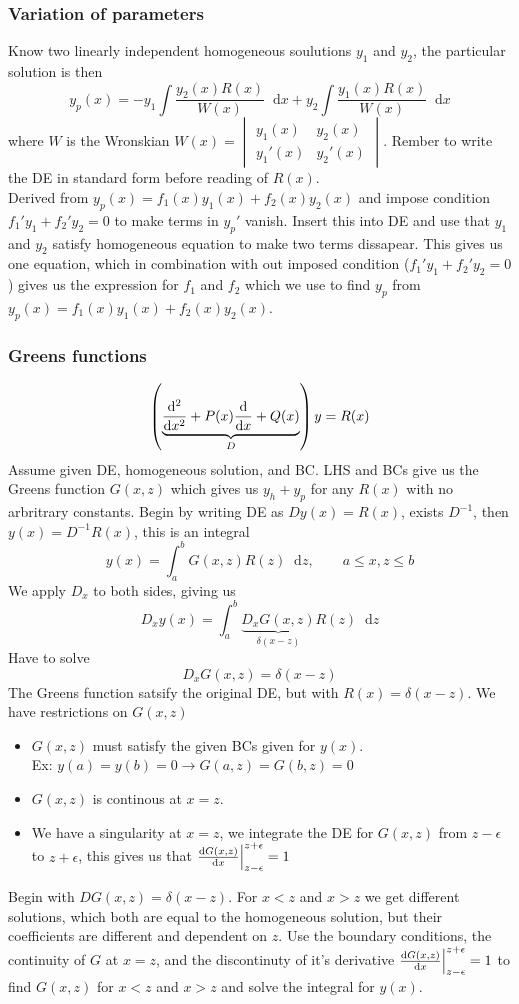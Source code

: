 \documentclass[a4paper, 10pt]{article}
\newcommand*\diff{\mathop{}\!\mathrm{d}}
\begin{document}
\begin{multicols*}{3}
\subsubsection*{\small Variation of parameters}
Know two linearly independent homogeneous soulutions $y_1$ and $y_2$, the particular solution is then
$$ y_p(x) = -y_1 \int \frac{y_2(x)R(x)}{W(x)} \diff x + y_2 \int \frac{y_1(x) R(x)}{W(x)}\diff x$$
where $W$ is the Wronskian $W(x) = \begin{vmatrix} y_1(x)  & y_2(x)\\ y_1'(x) & y_2'(x) \end{vmatrix}.$ Rember to write the DE in standard form before reading of $R(x)$. \\
Derived from $y_p(x) = f_1(x)y_1(x) + f_2(x)y_2(x)$ and impose condition $f_1'y_1 + f_2'y_2 = 0$ to make terms in $y_p'$ vanish. Insert this into DE and use that $y_1$ and $y_2$ satisfy homogeneous equation to make two terms dissapear. This gives us one equation, which in combination with out imposed condition ($f_1'y_1 + f_2'y_2 = 0$) gives us the expression for $f_1$ and $f_2$ which we use to find $y_p$ from $y_p(x) = f_1(x)y_1(x) + f_2(x)y_2(x)$.

\subsubsection*{\small Greens functions}
$$ \left(\underbrace{\dv[2]{}{x} + P(x)\dv{}{x} + Q(x)}_{D}\right)y = R(x) $$
Assume given DE, homogeneous solution, and BC. LHS and BCs give us the Greens function $G(x,z)$ which gives us $y_h + y_p$ for any $R(x)$ with no arbritrary constants. Begin by writing DE as $Dy(x)=R(x)$, exists $D^{-1}$, then $y(x) = D^{-1}R(x)$, this is an integral $$y(x) = \int_a^b G(x,z)R(z)\diff z, \qquad a \leq x, z \leq b$$
We apply $D_x$ to both sides, giving us
$$D_xy(x) = \int_a^b \underbrace{D_xG(x,z)}_{\delta(x-z)}R(z)\diff z$$
Have to solve
$$ D_xG(x,z) = \delta(x-z)$$
The Greens function satsify the original DE, but with $R(x) = \delta(x-z)$. We have restrictions on $G(x,z)$
\begin{itemize}
  \item $G(x,z)$ must satisfy the given BCs given for $y(x)$.\\ Ex: $y(a)=y(b)=0 \rightarrow G(a,z) = G(b,z)=0$
  \item $G(x,z)$ is continous at $x=z$.
  \item We have a singularity at $x=z$, we integrate the DE for $G(x,z)$ from $z-\epsilon$ to $z+\epsilon$, this gives us that $\dv{G(x,z)}{x}\Big|_{z-\epsilon}^{z+\epsilon} = 1$
\end{itemize}
Begin with $DG(x,z)=\delta(x-z)$. For $x<z$ and $x>z$ we get different solutions, which both are equal to the homogeneous solution, but their coefficients are different and dependent on $z$. Use the boundary conditions, the continuity of $G$ at $x=z$, and the discontinuty of it's derivative $\dv{G(x,z)}{x}\Big|_{z-\epsilon}^{z+\epsilon} = 1$ to find $G(x,z)$ for $x<z$ and $x>z$ and solve the integral for $y(x)$.


\end{multicols*}
\end{document}
